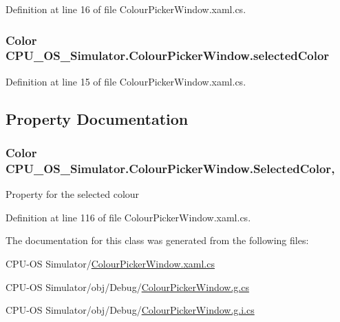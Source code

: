 Definition at line 16 of file Colour\+Picker\+Window.\+xaml.\+cs.

\hypertarget{class_c_p_u___o_s___simulator_1_1_colour_picker_window_a1c1653bebad209bd313da5a18ecea9bc}{}
\subsubsection[{selected\+Color}]{\setlength{\rightskip}{0pt plus 5cm}Color C\+P\+U\+\_\+\+O\+S\+\_\+\+Simulator.\+Colour\+Picker\+Window.\+selected\+Color\hspace{0.3cm}{\ttfamily [private]}}\label{class_c_p_u___o_s___simulator_1_1_colour_picker_window_a1c1653bebad209bd313da5a18ecea9bc}


Definition at line 15 of file Colour\+Picker\+Window.\+xaml.\+cs.



\subsection{Property Documentation}
\hypertarget{class_c_p_u___o_s___simulator_1_1_colour_picker_window_a4e51070f2e58d178bf773acb4200e76e}{}
\subsubsection[{Selected\+Color}]{\setlength{\rightskip}{0pt plus 5cm}Color C\+P\+U\+\_\+\+O\+S\+\_\+\+Simulator.\+Colour\+Picker\+Window.\+Selected\+Color\hspace{0.3cm}{\ttfamily [get]}, {\ttfamily [set]}}\label{class_c_p_u___o_s___simulator_1_1_colour_picker_window_a4e51070f2e58d178bf773acb4200e76e}


Property for the selected colour 



Definition at line 116 of file Colour\+Picker\+Window.\+xaml.\+cs.



The documentation for this class was generated from the following files\+:\begin{DoxyCompactItemize}
\item 
C\+P\+U-\/\+O\+S Simulator/\hyperlink{_colour_picker_window_8xaml_8cs}{Colour\+Picker\+Window.\+xaml.\+cs}\item 
C\+P\+U-\/\+O\+S Simulator/obj/\+Debug/\hyperlink{_colour_picker_window_8g_8cs}{Colour\+Picker\+Window.\+g.\+cs}\item 
C\+P\+U-\/\+O\+S Simulator/obj/\+Debug/\hyperlink{_colour_picker_window_8g_8i_8cs}{Colour\+Picker\+Window.\+g.\+i.\+cs}\end{DoxyCompactItemize}
